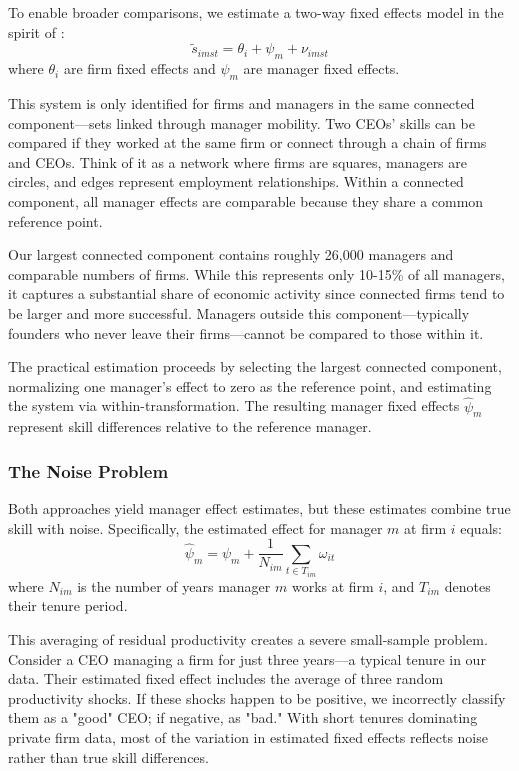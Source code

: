 \documentclass[11pt,a4paper]{article}
\begin{document}
To enable broader comparisons, we estimate a two-way fixed effects model in the spirit of \citet{Abowd1999Econometrica}:
\begin{equation}
\tilde{s}_{imst} = \theta_i + \psi_m + \nu_{imst}
\end{equation}
where $\theta_i$ are firm fixed effects and $\psi_m$ are manager fixed effects.

This system is only identified for firms and managers in the same connected component—sets linked through manager mobility. Two CEOs' skills can be compared if they worked at the same firm or connect through a chain of firms and CEOs. Think of it as a network where firms are squares, managers are circles, and edges represent employment relationships. Within a connected component, all manager effects are comparable because they share a common reference point.

Our largest connected component contains roughly 26,000 managers and comparable numbers of firms. While this represents only 10-15\% of all managers, it captures a substantial share of economic activity since connected firms tend to be larger and more successful. Managers outside this component—typically founders who never leave their firms—cannot be compared to those within it.

The practical estimation proceeds by selecting the largest connected component, normalizing one manager's effect to zero as the reference point, and estimating the system via within-transformation. The resulting manager fixed effects $\hat{\psi}_m$ represent skill differences relative to the reference manager.

\subsubsection{The Noise Problem}

Both approaches yield manager effect estimates, but these estimates combine true skill with noise. Specifically, the estimated effect for manager $m$ at firm $i$ equals:
\begin{equation}
\hat{\psi}_m = \psi_m + \frac{1}{N_{im}} \sum_{t \in T_{im}} \omega_{it}
\end{equation}
where $N_{im}$ is the number of years manager $m$ works at firm $i$, and $T_{im}$ denotes their tenure period.

This averaging of residual productivity creates a severe small-sample problem. Consider a CEO managing a firm for just three years—a typical tenure in our data. Their estimated fixed effect includes the average of three random productivity shocks. If these shocks happen to be positive, we incorrectly classify them as a "good" CEO; if negative, as "bad." With short tenures dominating private firm data, most of the variation in estimated fixed effects reflects noise rather than true skill differences.
\end{document}
